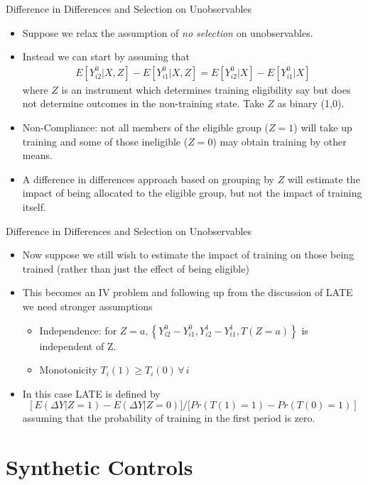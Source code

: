 \begin{frame}{Difference in Differences and Selection on Unobservables}
\begin{itemize}
\item Suppose we relax the assumption of \emph{no selection} on unobservables. 
\item Instead we can start by assuming that
\begin{align*}
E[Y_{i2}^0 | X,Z] - E[Y_{i1}^0 | X,Z] = E[Y_{i2}^0 | X] - E[Y_{i1}^0 | X]
\end{align*} 
where $Z$ is an instrument which determines training eligibility say but does not determine outcomes in the non-training state. Take $Z$ as binary (1,0).
\item Non-Compliance: not all members of the eligible group ($Z = 1$) will take up training and some of those ineligible ($Z = 0$) may obtain training by other means.
\item A difference in differences approach based on grouping by $Z$ will estimate the impact of being allocated to the eligible group, but not the impact of training itself.
\end{itemize}
\end{frame}

\begin{frame}{Difference in Differences and Selection on Unobservables}
\begin{itemize}
\item Now suppose we still wish to estimate the impact of training on those being trained (rather than just the effect of being eligible)
\item This becomes an IV problem and following up from the discussion of LATE we need stronger assumptions
\begin{itemize}
\item  Independence: for $Z = a, \left\{Y_{i2}^0 - Y_{i1}^0, Y_{i2}^1 - Y_{i1}^1, T(Z=a)\right\}$ is independent of Z.
\item Monotonicity $T_i(1) \ge T_i(0) \, \forall \, i$
\end{itemize}
\item In this case LATE is defined by
 $$\left [E(\Delta Y | Z = 1) - E(\Delta Y | Z = 0)] / [Pr(T(1) = 1) - Pr(T(0) = 1) \right]$$
assuming that the probability of training in the first period is zero.
\end{itemize}              
\end{frame}

\section{Synthetic Controls}

